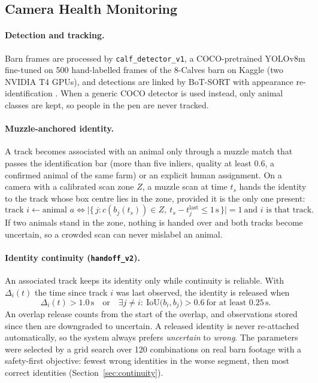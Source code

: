 \documentclass[11pt,letterpaper]{article}
\begin{document}
\subsection{Camera Health Monitoring}

\paragraph{Detection and tracking.} Barn frames are processed by \texttt{calf\_detector\_v1}, a COCO-pretrained YOLOv8m fine-tuned on 500 hand-labelled frames of the 8-Calves barn \cite{fang2025eightcalves} on Kaggle (two NVIDIA T4 GPUs), and detections are linked by BoT-SORT with appearance re-identification \cite{aharon2022botsort}. When a generic COCO detector is used instead, only animal classes are kept, so people in the pen are never tracked.

\paragraph{Muzzle-anchored identity.} A track becomes associated with an animal only through a muzzle match that passes the identification bar (more than five inliers, quality at least 0.6, a confirmed animal of the same farm) or an explicit human assignment. On a camera with a calibrated scan zone $Z$, a muzzle scan at time $t_s$ hands the identity to the track whose box centre lies in the zone, provided it is the only one present:
\begin{equation}
\text{track } i \leftarrow \text{animal } a \iff \big|\{\, j : c(b_j(t_s)) \in Z,\ t_s - t_j^{\text{last}} \le 1\,\text{s} \,\}\big| = 1 \ \text{and } i \text{ is that track}.
\end{equation}
If two animals stand in the zone, nothing is handed over and both tracks become uncertain, so a crowded scan can never mislabel an animal.

\paragraph{Identity continuity (\texttt{handoff\_v2}).} An associated track keeps its identity only while continuity is reliable. With $\Delta_i(t)$ the time since track $i$ was last observed, the identity is released when
\begin{equation}
\Delta_i(t) > 1.0\,\text{s} \quad\text{or}\quad \exists j \ne i:\ \mathrm{IoU}\big(b_i, b_j\big) > 0.6 \ \text{for at least } 0.25\,\text{s}.
\end{equation}
An overlap release counts from the start of the overlap, and observations stored since then are downgraded to uncertain. A released identity is never re-attached automatically, so the system always prefers \emph{uncertain} to \emph{wrong}. The parameters were selected by a grid search over 120 combinations on real barn footage with a safety-first objective: fewest wrong identities in the worse segment, then most correct identities (Section~\ref{sec:continuity}).
\end{document}
